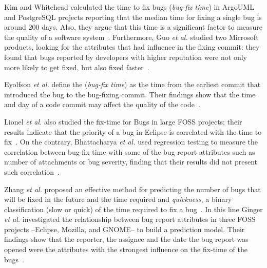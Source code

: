 \documentclass[10pt, conference]{IEEEtran}
\begin{document}
Kim and Whitehead calculated the time to fix bugs (\emph{bug-fix time}) in ArgoUML and PostgreSQL projects reporting that the median time for fixing a single bug is around 200 days. Also, they argue that this time is a significant factor to measure the quality of a software system~\cite{kim2006long}. Furthermore, Guo \emph{et al.} studied two Microsoft products, looking for the attributes that had influence in the fixing commit: they found that bugs reported by developers with higher reputation were not only more likely to get fixed, but also fixed faster~\cite{guo2010characterizing}.

Eyolfson \emph{et al.} define the (\emph{bug-fix time}) as the time from the earliest commit that introduced the bug to the bug-fixing commit. Their findings show that the time and day of a code commit may affect the quality of the code~\cite{eyolfson2011time}.

Lionel \emph{et al.} also studied the fix-time for Bugs in large FOSS projects; their results indicate that the priority of a bug in Eclipse is correlated with the time to fix~\cite{marks2011studying}. On the contrary, Bhattacharya \emph{et al.} used regression testing to measure the correlation between bug-fix time with some of the bug report attributes such as number of attachments or bug severity, finding that their results did not present such correlation~\cite{bhattacharya2011bug}.



Zhang \emph{et al.} proposed an effective method for predicting the number of bugs that will be fixed in the future and the time required and \emph{quickness}, a binary classification (slow or quick) of the time required to fix a bug~\cite{zhang2013predicting}. In this line Ginger \emph{et al.} investigated the relationship between bug report attributes in three FOSS projects --Eclipse, Mozilla, and GNOME-- to build a prediction model. Their findings show that the reporter, the assignee and the date the bug report was opened were the attributes with the strongest influence on the fix-time of the bugs~\cite{giger2010predicting}.
\end{document}
